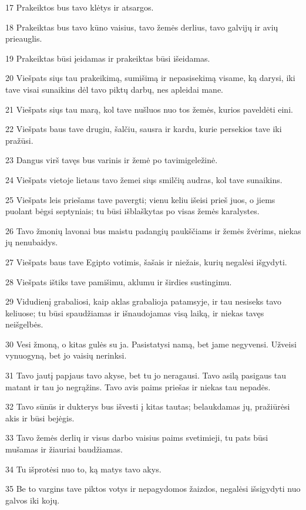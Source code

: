 \par 17 Prakeiktos bus tavo klėtys ir atsargos. 
\par 18 Prakeiktas bus tavo kūno vaisius, tavo žemės derlius, tavo galvijų ir avių prieauglis. 
\par 19 Prakeiktas būsi įeidamas ir prakeiktas būsi išeidamas. 
\par 20 Viešpats siųs tau prakeikimą, sumišimą ir nepasisekimą visame, ką darysi, iki tave visai sunaikins dėl tavo piktų darbų, nes apleidai mane. 
\par 21 Viešpats siųs tau marą, kol tave nušluos nuo tos žemės, kurios paveldėti eini. 
\par 22 Viešpats baus tave drugiu, šalčiu, sausra ir kardu, kurie persekios tave iki pražūsi. 
\par 23 Dangus virš tavęs bus varinis ir žemė po tavimi­geležinė. 
\par 24 Viešpats vietoje lietaus tavo žemei siųs smilčių audras, kol tave sunaikins. 
\par 25 Viešpats leis priešams tave pavergti; vienu keliu išeisi prieš juos, o jiems puolant bėgsi septyniais; tu būsi išblaškytas po visas žemės karalystes. 
\par 26 Tavo žmonių lavonai bus maistu padangių paukščiams ir žemės žvėrims, niekas jų nenubaidys. 
\par 27 Viešpats baus tave Egipto votimis, šašais ir niežais, kurių negalėsi išgydyti. 
\par 28 Viešpats ištiks tave pamišimu, aklumu ir širdies sustingimu. 
\par 29 Vidudienį grabaliosi, kaip aklas grabalioja patamsyje, ir tau nesiseks tavo keliuose; tu būsi spaudžiamas ir išnaudojamas visą laiką, ir niekas tavęs neišgelbės. 
\par 30 Vesi žmoną, o kitas gulės su ja. Pasistatysi namą, bet jame negyvensi. Užveisi vynuogyną, bet jo vaisių nerinksi. 
\par 31 Tavo jautį papjaus tavo akyse, bet tu jo neragausi. Tavo asilą pasigaus tau matant ir tau jo negrąžins. Tavo avis paims priešas ir niekas tau nepadės. 
\par 32 Tavo sūnūs ir dukterys bus išvesti į kitas tautas; belaukdamas jų, pražiūrėsi akis ir būsi bejėgis. 
\par 33 Tavo žemės derlių ir visus darbo vaisius paims svetimieji, tu pats būsi mušamas ir žiauriai baudžiamas. 
\par 34 Tu išprotėsi nuo to, ką matys tavo akys. 
\par 35 Be to vargins tave piktos votys ir nepagydomos žaizdos, negalėsi išsigydyti nuo galvos iki kojų. 
